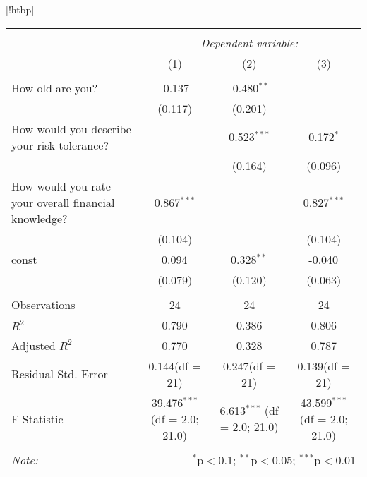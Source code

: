 \documentclass{article}
\begin{document}
\begin{center}[!htbp] \centering
\begin{longtable}{@{\extracolsep{5pt}}lccc}
\\[-1.8ex]\hline
\hline \\[-1.8ex]
& \multicolumn{3}{c}{\textit{Dependent variable:}} \
\cr \cline{3-4}
\\[-1.8ex] & (1) & (2) & (3) \\
\hline \\[-1.8ex]
 How old are you? & -0.137$^{}$ & -0.480$^{**}$ & \\
  & (0.117) & (0.201) & \\
 How would you describe your risk tolerance? & & 0.523$^{***}$ & 0.172$^{*}$ \\
  & & (0.164) & (0.096) \\
 How would you rate your overall financial knowledge? & 0.867$^{***}$ & & 0.827$^{***}$ \\
  & (0.104) & & (0.104) \\
 const & 0.094$^{}$ & 0.328$^{**}$ & -0.040$^{}$ \\
  & (0.079) & (0.120) & (0.063) \\
\hline \\[-1.8ex]
 Observations & 24 & 24 & 24 \\
 $R^2$ & 0.790 & 0.386 & 0.806 \\
 Adjusted $R^2$ & 0.770 & 0.328 & 0.787 \\
 Residual Std. Error & 0.144(df = 21) & 0.247(df = 21) & 0.139(df = 21)  \\
 F Statistic & 39.476$^{***}$ (df = 2.0; 21.0) & 6.613$^{***}$ (df = 2.0; 21.0) & 43.599$^{***}$ (df = 2.0; 21.0) \\
\hline
\hline \\[-1.8ex]
\textit{Note:} & \multicolumn{3}{r}{$^{*}$p$<$0.1; $^{**}$p$<$0.05; $^{***}$p$<$0.01} \\
\end{longtable}
\end{center}
\end{document}
